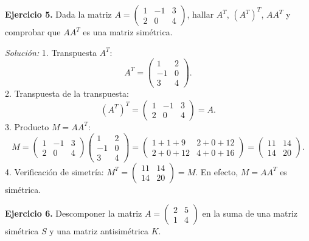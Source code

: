 \documentclass[11pt,letterpaper]{article}
\theoremstyle{definition}
\theoremstyle{plain}
\begin{document}
\vspace{0.3cm}
\textbf{Ejercicio 5.} Dada la matriz $A = \begin{pmatrix} 1 & -1 & 3 \\ 2 & 0 & 4 \end{pmatrix}$, hallar $A^T$, $(A^T)^T$, $A A^T$ y comprobar que $A A^T$ es una matriz simétrica.

\emph{Solución:}
1. Transpuesta $A^T$:
\[
A^T = \begin{pmatrix} 1 & 2 \\ -1 & 0 \\ 3 & 4 \end{pmatrix}.
\]
2. Transpuesta de la transpuesta:
\[
(A^T)^T = \begin{pmatrix} 1 & -1 & 3 \\ 2 & 0 & 4 \end{pmatrix} = A.
\]
3. Producto $M = A A^T$:
\[
M = \begin{pmatrix} 1 & -1 & 3 \\ 2 & 0 & 4 \end{pmatrix} \begin{pmatrix} 1 & 2 \\ -1 & 0 \\ 3 & 4 \end{pmatrix} = \begin{pmatrix} 1+1+9 & 2+0+12 \\ 2+0+12 & 4+0+16 \end{pmatrix} = \begin{pmatrix} 11 & 14 \\ 14 & 20 \end{pmatrix}.
\]
4. Verificación de simetría: $M^T = \begin{pmatrix} 11 & 14 \\ 14 & 20 \end{pmatrix} = M$. En efecto, $M = A A^T$ es simétrica.

\vspace{0.3cm}
\textbf{Ejercicio 6.} Descomponer la matriz $A = \begin{pmatrix} 2 & 5 \\ 1 & 4 \end{pmatrix}$ en la suma de una matriz simétrica $S$ y una matriz antisimétrica $K$.
\end{document}

